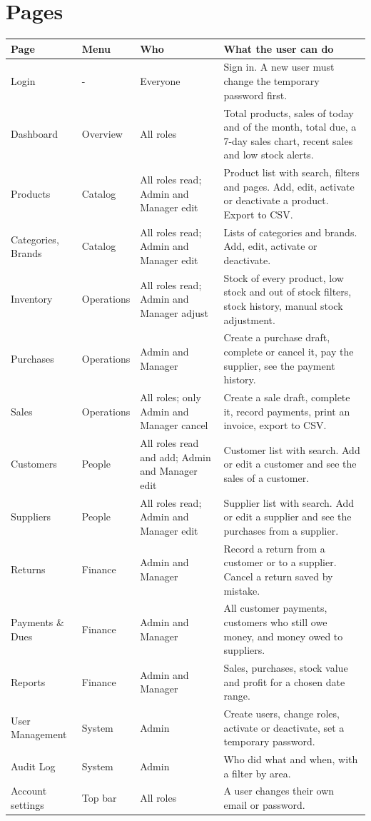 \documentclass[11pt,a4paper]{article}
\begin{document}
\section{Pages}
\begin{longtable}{@{}P{2.7cm}P{1.9cm}P{3.4cm}P{6.3cm}@{}}
\toprule
\textbf{Page} & \textbf{Menu} & \textbf{Who} & \textbf{What the user can do} \\
\midrule
\endhead
Login & - & Everyone & Sign in. A new user must change the temporary password first. \\
Dashboard & Overview & All roles & Total products, sales of today and of the month, total due, a 7-day sales chart, recent sales and low stock alerts. \\
Products & Catalog & All roles read; Admin and Manager edit & Product list with search, filters and pages. Add, edit, activate or deactivate a product. Export to CSV. \\
Categories, Brands & Catalog & All roles read; Admin and Manager edit & Lists of categories and brands. Add, edit, activate or deactivate. \\
Inventory & Operations & All roles read; Admin and Manager adjust & Stock of every product, low stock and out of stock filters, stock history, manual stock adjustment. \\
Purchases & Operations & Admin and Manager & Create a purchase draft, complete or cancel it, pay the supplier, see the payment history. \\
Sales & Operations & All roles; only Admin and Manager cancel & Create a sale draft, complete it, record payments, print an invoice, export to CSV. \\
Customers & People & All roles read and add; Admin and Manager edit & Customer list with search. Add or edit a customer and see the sales of a customer. \\
Suppliers & People & All roles read; Admin and Manager edit & Supplier list with search. Add or edit a supplier and see the purchases from a supplier. \\
Returns & Finance & Admin and Manager & Record a return from a customer or to a supplier. Cancel a return saved by mistake. \\
Payments \& Dues & Finance & Admin and Manager & All customer payments, customers who still owe money, and money owed to suppliers. \\
Reports & Finance & Admin and Manager & Sales, purchases, stock value and profit for a chosen date range. \\
User Management & System & Admin & Create users, change roles, activate or deactivate, set a temporary password. \\
Audit Log & System & Admin & Who did what and when, with a filter by area. \\
Account settings & Top bar & All roles & A user changes their own email or password. \\
\bottomrule
\end{longtable}
\end{document}
